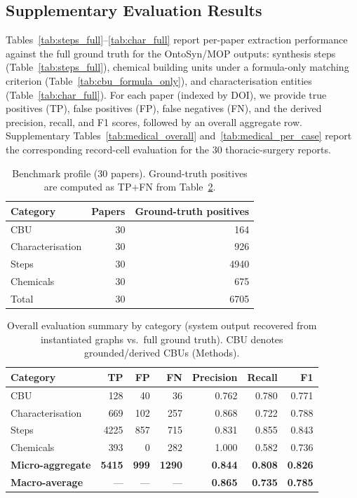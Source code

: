 \subsection{Supplementary Evaluation Results}
  

Tables~\ref{tab:steps_full}--\ref{tab:char_full} report per-paper extraction performance against the full ground truth for the OntoSyn/MOP outputs: synthesis steps (Table~\ref{tab:steps_full}), chemical building units under a formula-only matching criterion (Table~\ref{tab:cbu_formula_only}), and characterisation entities (Table~\ref{tab:char_full}). For each paper (indexed by DOI), we provide true positives (TP), false positives (FP), false negatives (FN), and the derived precision, recall, and F1 scores, followed by an overall aggregate row. Supplementary Tables~\ref{tab:medical_overall} and~\ref{tab:medical_per_case} report the corresponding record-cell evaluation for the 30 thoracic-surgery reports.

\begin{table}[!hpbt]
\centering
\caption{Benchmark profile (30 papers). Ground-truth positives are computed as TP$+$FN from Table~\ref{tab:overall}.}
\label{tab:benchmark_profile}
\begin{tabular}{lrr}
\hline
Category & Papers & Ground-truth positives \\
\hline
CBU              & 30 & 164 \\
Characterisation & 30 & 926 \\
Steps            & 30 & 4940 \\
Chemicals        & 30 & 675 \\
\hline
Total            & 30 & 6705 \\
\hline
\end{tabular}
\end{table}



\begin{table}[t]
\centering
\caption{Overall evaluation summary by category (system output recovered from instantiated graphs vs.\ full ground truth). CBU denotes grounded/derived CBUs (Methods).}
\label{tab:overall}
\begin{tabular}{lrrrrrr}
\hline
Category & TP & FP & FN & Precision & Recall & F1 \\
\hline
CBU              & 128  &  40 &  36 & 0.762 & 0.780 & 0.771 \\
Characterisation & 669  & 102 & 257 & 0.868 & 0.722 & 0.788 \\
Steps            & 4225 & 857 & 715 & 0.831 & 0.855 & 0.843 \\
Chemicals        & 393  &   0 & 282 & 1.000 & 0.582 & 0.736 \\
\hline
\textbf{Micro-aggregate} & \textbf{5415} & \textbf{999} & \textbf{1290} & \textbf{0.844} & \textbf{0.808} & \textbf{0.826} \\
\textbf{Macro-average}   & --- & --- & --- & \textbf{0.865} & \textbf{0.735} & \textbf{0.785} \\
\hline
\end{tabular}
\end{table}

